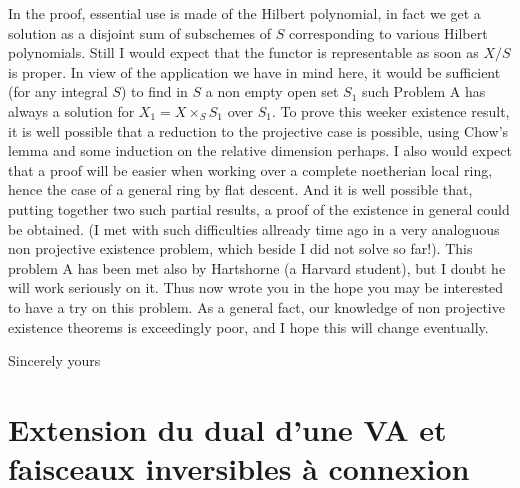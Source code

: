 \documentclass[11pt,a4paper]{article}
\begin{document}
In the proof, essential use is made of the Hilbert polynomial, in fact we get a solution as a disjoint sum of subschemes of $S$ corresponding to various Hilbert polynomials. Still I would expect that the \struck{\ill{}} functor is representable as soon as $X/S$ is proper. In view of the application we have in mind here, it would be sufficient (for any integral $S$) to find in $S$ a non empty \struck{\ill{}} open set $S_1$ such Problem A has always a solution for $X_1 = X \times_S S_1$ over $S_1$. To prove this weeker existence result, it is well possible that a reduction to the projective case is possible, using Chow's lemma and some induction on the relative dimension perhaps. I also would expect that a proof will be easier when working over a complete noetherian local ring, hence the case of a general   ring by flat descent. And it is well possible that, putting together two such partial results, a proof of the existence in general could be obtained. (I met with such difficulties allready time ago in a very analoguous non projective existence problem, which beside I did not solve so far!). This problem A has been met also by Hartshorne (a Harvard student), but I doubt he will work seriously on it. Thus  now wrote you in the hope you may be interested to have a try on this problem. As a general fact, our knowledge of non projective existence theorems is exceedingly poor, and I hope this will change eventually.

Sincerely yours


\section{Extension du dual d'une VA et faisceaux inversibles à connexion}


\end{document}
